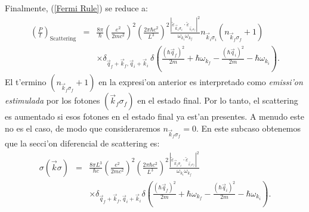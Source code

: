 Finalmente, (\ref{Fermi Rule}) se reduce a:
\begin{eqnarray}
\left( \frac{P}{t}\right)_{\text{Scattering}}&=&\frac{8\pi}{\hbar}\left(
\frac{e^2}{2mc^2}\right)^2\left(
\frac{2\pi\hbar c^2}{L^3}\right)^2\frac{\left| \check{\varepsilon
}_{\vec{k}_i\sigma_i}\cdot\check{\varepsilon}_{_{\vec{k}_f\sigma_f}%
}\right|^2}{\omega_{k_i}\omega_{k_f}}n_{\vec{k}_i\sigma_i%
}\left( n_{\vec{k}_f\sigma_f}+1\right) \nonumber\\
&& \times \delta_{\vec{q}_f+\vec{k}%
_f,\vec{q}_i+\vec{k}_i}\,\delta\left( \frac{\left( \hbar\vec{q}%
_f\right)^2}{2m}+\hbar\omega_{k_f}-\frac{\left( \hbar\vec{q}%
_i\right)^2}{2m}-\hbar\omega_{k_i}\right) .
\end{eqnarray}
El t'ermino $\left( n_{\vec{k}_f\sigma_f}+1\right) $ en la
expresi'on anterior es interpretado como \textit{emissi'on estimulada} por los
fotones $(\vec{k}_f\sigma_f)$ en el estado final. Por lo tanto, el
scattering es aumentado si esos fotones en el estado final ya est'an presentes.
A menudo este no es el caso, de modo que consideraremos
$n_{\vec{k}_f\sigma_f}=0$. En este subcaso obtenemos que la secci'on
diferencial de scattering es:%
\begin{eqnarray}
\sigma\left( \vec{k}\sigma\right) &=&\frac{8\pi L^3}{\hbar c}\left(
\frac{e^2}{2mc^2}\right)^2\left( \frac{2\pi\hbar c^2}{L^3%
}\right)^2\frac{\left| \check{\varepsilon}_{\vec{k}_i\sigma_i%
}\cdot\check{\varepsilon}_{_{\vec{k}_f\sigma_f}}\right|^2}%
{\omega_{k_i}\omega_{k_f}} \nonumber\\
&& \times \delta_{\vec{q}_f+\vec{k}_f,\vec{q}_i%
+\vec{k}_i}\delta\left( \frac{\left( \hbar\vec{q}_f\right)^2}%
{2m}+\hbar\omega_{k_f}-\frac{\left( \hbar\vec{q}_i\right)^2}%
{2m}-\hbar\omega_{k_i}\right)
.\label{Seccion Transversal Absorcion <f|H2|i> }%
\end{eqnarray}


